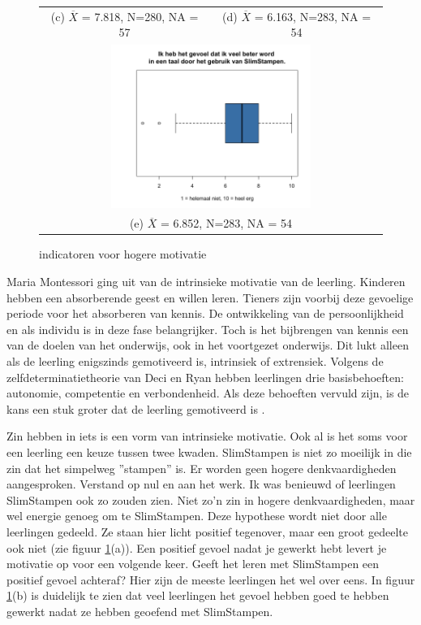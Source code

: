 \documentclass[12pt, a4paper]{article}
\begin{document}
\begin{figure}
\begin{tabular}{cc}
    (c) $\overline{X}$ = 7.818, N=280, NA = 57  & (d) $\overline{X}$ = 6.163, N=283, NA = 54  \\[6pt]
    \multicolumn{2}{c}{\includegraphics[width=65mm]{23-BeterInTaal.png} }\\
    \multicolumn{2}{c}{(e) $\overline{X}$ = 6.852, N=283, NA = 54}
    \end{tabular}
    \caption{indicatoren voor hogere motivatie}
    \label{fig:motivatie}
    \end{figure}

Maria Montessori ging uit van de intrinsieke motivatie van de leerling. Kinderen hebben een absorberende geest en willen leren. Tieners zijn voorbij deze gevoelige periode voor het absorberen van kennis. De ontwikkeling van de persoonlijkheid en als individu is in deze fase belangrijker. Toch is het bijbrengen van kennis een van de doelen van het onderwijs, ook in het voortgezet onderwijs. Dit lukt alleen als de leerling enigszinds gemotiveerd is, intrinsiek of extrensiek. Volgens de zelfdeterminatietheorie van Deci en Ryan hebben leerlingen drie basisbehoeften: autonomie, competentie en verbondenheid. Als deze behoeften vervuld zijn, is de kans een stuk groter dat de leerling gemotiveerd is \cite[p.436-439]{woolfolk}.

Zin hebben in iets is een vorm van intrinsieke motivatie. Ook al is het soms voor een leerling een keuze tussen twee kwaden. SlimStampen is niet zo moeilijk in die zin dat het simpelweg ''stampen'' is. Er worden geen hogere denkvaardigheden aangesproken. Verstand op nul en aan het werk. Ik was benieuwd of leerlingen SlimStampen ook zo zouden zien. Niet zo'n zin in hogere denkvaardigheden, maar wel energie genoeg om te SlimStampen. Deze hypothese wordt niet door alle leerlingen gedeeld. Ze staan hier licht positief tegenover, maar een groot gedeelte ook niet (zie figuur \ref*{fig:motivatie}(a)).
Een positief gevoel nadat je gewerkt hebt levert je motivatie op voor een volgende keer. Geeft het leren met SlimStampen een positief gevoel achteraf? Hier zijn de meeste leerlingen het wel over eens. In figuur \ref*{fig:motivatie}(b) is duidelijk te zien dat veel leerlingen het gevoel hebben goed te hebben gewerkt nadat ze hebben geoefend met SlimStampen.
\end{document}
